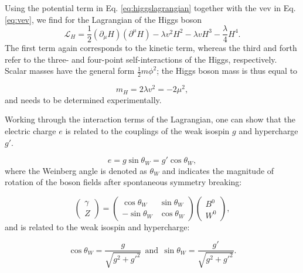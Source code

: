 \noindent Using the potential term in Eq. \ref{eq:higgslagrangian} together with the vev in Eq. \ref{eq:vev}, we find for the Lagrangian of the Higgs boson
\begin{equation}
\mathcal{L}_H = \frac{1}{2}\left(\partial_\mu H\right)\left(\partial^\mu H\right) - \lambda v^2 H^2 - \lambda v H^3 - \frac{\lambda}{4}H^4.
\end{equation}
The first term again corresponds to the kinetic term, whereas the third and forth refer to the three- and four-point self-interactions of the Higgs, respectively. Scalar masses have the general form $\frac{1}{2}m\phi^2$; the Higgs boson mass is thus equal to 

\begin{equation}
m_H = 2\lambda v^2 = - 2\mu^2,
\end{equation}
and needs to be determined experimentally.

Working through the interaction terms of the Lagrangian, one can show that the electric charge $e$  is related to the couplings of the weak isospin $g$ and hypercharge $g'$.

\begin{equation}
\label{eq:weinbergangle}
e = g \sin \theta_{W} = g' \cos \theta_W,
\end{equation} 
where the Weinberg angle is denoted as $\theta_W$ and indicates the magnitude of rotation of the boson fields after spontaneous symmetry breaking:

\begin{equation}
\begin{pmatrix} \gamma \\ Z \end{pmatrix} = 
\begin{pmatrix} \cos{\theta_W} & \sin{\theta_W} \\ -\sin{\theta_W} & \cos{\theta_W} \end{pmatrix} \begin{pmatrix} B^0 \\ W^0 \end{pmatrix},
\end{equation}
and is related to the weak isospin and hypercharge:

\begin{equation}
\cos \theta_W = \frac{g}{\sqrt{g^2 + g'^2}} \ \ \textrm{and} \ \ \sin \theta_W = \frac{g'}{\sqrt{g^2 + g'^2}}.
\end{equation}



